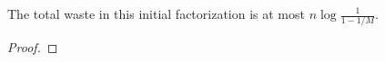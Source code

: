 \begin{lemma}
\label{initial-factorization-waste}
\leanok
The total waste in this initial factorization is at most
  $n \log \frac{1}{1-1/M}$.
\end{lemma}
\begin{proof}
\leanok
\end{proof}
